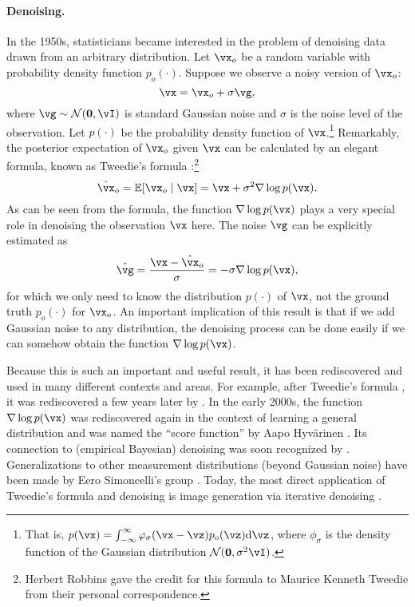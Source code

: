 \documentclass[../../book-main.tex]{subfiles}
\begin{document}
\paragraph{Denoising.} In the 1950s, statisticians became interested in the problem of denoising data drawn from an arbitrary distribution. Let \(\vx_{o}\) be a random variable with probability density function \(p_{o}(\cdot)\). Suppose we observe a noisy version of \(\vx_{o}\):
\begin{equation}
    \vx = \vx_{o} + \sigma \vg, 
\end{equation}
where \(\vg \sim \dNorm(\vzero, \vI)\) is standard Gaussian noise and \(\sigma\) is the noise level of the observation. Let \(p(\cdot)\) be the probability density function of \(\vx\).\footnote{That is, \(p(\vx) = \int_{-\infty}^{\infty} \phi_{\sigma}(\vx - \vz)p_{o}(\vz) \odif{\vz}\), where \(\phi_{\sigma}\) is the density function of the Gaussian distribution \(\mathcal{N}(\vzero, \sigma^{2} \vI)\).} Remarkably, the posterior expectation of \(\vx_{o}\) given \(\vx\) can be calculated by an elegant formula, known as Tweedie's formula \cite{Robbins1956AnEB}:\footnote{Herbert Robbins gave the credit for this formula to Maurice Kenneth Tweedie from their personal correspondence.}
\begin{equation}
    \hat{\vx}_{o} = \Ex[\vx_{o}\mid \vx] = \vx + \sigma^{2} \nabla \log p(\vx).
\end{equation}
As can be seen from the formula, the function \(\nabla \log p(\vx)\) plays a very special role in denoising the observation \(\vx\) here. The noise \(\vg\) can be explicitly estimated as
\begin{equation}
    \hat{\vg} = \frac{\vx - \hat{\vx}_{o}}{\sigma} = -\sigma \nabla \log p(\vx),
\end{equation}
for which we only need to know the distribution \(p(\cdot)\) of \(\vx\), not the ground truth \(p_{o}(\cdot)\) for \(\vx_{o}\). An important implication of this result is that if we add Gaussian noise to any distribution, the denoising process can be done easily if we can somehow obtain the function \(\nabla \log p(\vx)\).

Because this is such an important and useful result, it has been rediscovered and used in many different contexts and areas. For example, after Tweedie's formula \cite{Robbins1956AnEB}, it was rediscovered a few years later by \cite{Miyasawa61}. In the early 2000s, the function \(\nabla \log p(\vx)\) was rediscovered again in the context of learning a general distribution and was named the ``score function'' by Aapo Hyv\"{a}rinen \cite{hyvarinen05a}. Its connection to (empirical Bayesian) denoising was soon recognized by \cite{Vincent2011}.
Generalizations to other measurement distributions (beyond Gaussian noise) have been made by Eero Simoncelli's group \cite{Raphan10}. Today, the most direct application of Tweedie's formula and denoising is image generation via iterative denoising \cite{Kadkhodaie21a,ho2020denoising}.
\end{document}
